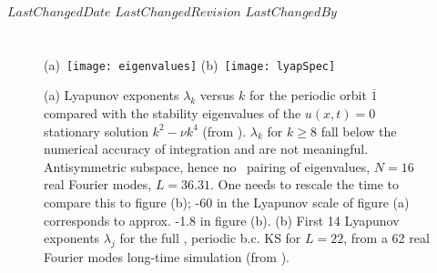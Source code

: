 \ifsvnmulti
 {$LastChangedDate$}
 {$LastChangedRevision$} {$LastChangedBy$}
\fi

\chapter{\KS}
\label{sect:LyapKS}

\begin{figure}
 (a)~\texttt{[image: eigenvalues]}
 (b)~\texttt{[image: lyapSpec]}
\caption{
(a)
Lyapunov exponents $\lambda_k$ versus $k$ for the periodic
orbit $\overline{1}$ compared with  the stability eigenvalues
of the $u(x,t)=0$ stationary solution $k^2- \nu k^4$ (from
). $\lambda_k$ for $k \geq 8$ fall
below the numerical accuracy of integration and are not
meaningful. Antisymmetric subspace,
hence no \ pairing of eigenvalues, $N=16$ real Fourier
modes, $L=36.31$. One needs to rescale the time to compare
this to figure (b); -60 in the Lyapunov scale of figure (a)
corresponds to approx. -1.8 in figure (b).
(b)
First 14 Lyapunov exponents $\lambda_j$ for the full
\statesp, periodic b.c. KS for $L=22$, from a 62 real Fourier
modes long-time simulation (from ).
}
\label{fig:lyapSpec}
\end{figure}


